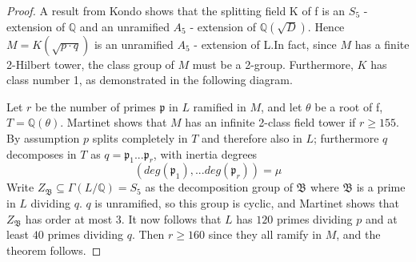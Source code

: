 \documentclass[12pt]{extarticle}
\newcommand{\Q}{\mathbb{Q}}
\newcommand{\<}{\langle}
\renewcommand{\>}{\rangle}
\theoremstyle{definition}
\begin{document}
\begin{proof}
A result from Kondo \cite{KOND} shows that the splitting field K
of f is an $S_5$ - extension of $\Q$ and an unramified $A_5$ - extension of $\Q(\sqrt{D})$. Hence $M=K\left(\sqrt{p \cdot q}\right)$ is an
unramified $A_5$ - extension of L.In fact, since $M$ has a finite 2-Hilbert tower, the class group of $M$ must be a 2-group. Furthermore, $K$ has class number 1, as demonstrated in the following diagram.
\begin{center}
\end{center}

Let $r$ be the number of primes $\mathfrak{p}$ in $L$ ramified in $M$, and let $\theta$ be a root of f, $T = \Q(\theta)$. Martinet \cite{MART1978} shows that $M$ has an infinite 2-class field tower if $r\geq 155$. By assumption $p$ splits completely in $T$ and therefore also in $L$; furthermore $q$ decomposes in $T$ as $q = \mathfrak{p}_1...\mathfrak{p}_r$, with inertia degrees
\begin{equation}
    (deg(\mathfrak{p}_1),...deg(\mathfrak{p}_r))=\mu 
\end{equation}
Write $Z_\mathfrak{B}\subseteq\Gamma(L/\Q) = S_5$ as the decomposition group of $\mathfrak{B}$ where $\mathfrak{B}$ is a prime in $L$ dividing $q$. $q$ is unramified, so this group is cyclic, and Martinet \cite{MART1978} shows that $Z_\mathfrak{B}$ has order at most $3$. It now follows that $L$ has $120$ primes dividing $p$ and at least $40$ primes dividing $q$. Then $r\geq 160$ since they all ramify in $M$, and the theorem follows.
\end{proof}
\end{document}
